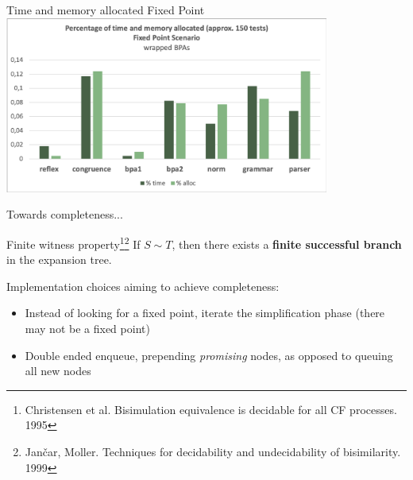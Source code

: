 \documentclass[10pt]{beamer}
\begin{document}
\begin{frame}{Time and memory allocated \hfill {\color{mLightBrown}Fixed Point}}
	\hspace*{-4mm}\includegraphics[height=5.8cm]{img/fixed_point2}
\end{frame}



\begin{frame}{Towards completeness...}

	\begin{block}{Finite witness property\footnote{ Christensen et al. Bisimulation equivalence is decidable for all CF processes. 1995}\footnote{Jan{\v{c}}ar, Moller. Techniques for decidability and undecidability of bisimilarity. 1999}}
		\smallskip
		If $S\sim T$, then there exists a {\bf finite successful branch} in the expansion tree.
	\end{block}

	\vspace*{5mm}
	
	Implementation choices aiming to achieve completeness:
	\begin{itemize}
		\item Instead of looking for a fixed point, iterate the simplification phase (there may not be a fixed point)
		\item Double ended enqueue, prepending \emph{promising} nodes, as opposed to queuing all new nodes
	\end{itemize}
\end{frame}
\end{document}
